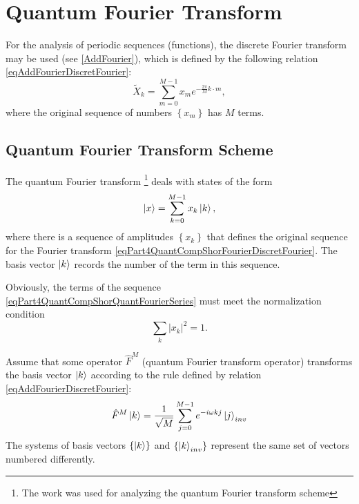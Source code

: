 \section{Quantum Fourier Transform}
For the analysis of periodic sequences (functions), the discrete Fourier transform may be used (see \autoref{AddFourier}), which is defined by the following relation \eqref{eqAddFourierDiscretFourier}:
\begin{equation}
\tilde{X}_k = \sum^{M - 1}_{m = 0} x_m e^{-\frac{2 \pi}{M} k\cdot m},
\label{eqPart4QuantCompShorFourierDiscretFourier}
\end{equation}
where the original sequence of numbers $\left\{x_m\right\}$ has $M$ terms.

\subsection{Quantum Fourier Transform Scheme}
The quantum Fourier transform \footnote{The work \cite{DBLP:conf/new2an/2015} was used for analyzing the quantum Fourier transform scheme} deals with states of the form 
\begin{equation}
\ket{x} = \sum_{k = 0}^{M - 1}x_k \ket{k},
\label{eqPart4QuantCompShorQuantFourierSeries}
\end{equation}
where there is a sequence of amplitudes $\left\{x_k\right\}$ that defines the original sequence for the Fourier transform \eqref{eqPart4QuantCompShorFourierDiscretFourier}. The basis vector $\ket{k}$ records the number of the term in this sequence.

Obviously, the terms of the sequence \eqref{eqPart4QuantCompShorQuantFourierSeries} must meet the normalization condition
\[
\sum_k\left|x_k\right|^2 = 1.
\]

Assume that some operator $\hat{F}^{M}$ (quantum Fourier transform operator) transforms the basis vector $\ket{k}$ according to the rule defined by relation \eqref{eqAddFourierDiscretFourier}:
\begin{equation}
\hat{F}^{M}\ket{k} = \frac{1}{\sqrt{M}}\sum_{j = 0}^{M -1} e^{-i \omega k j}\ket{j}_{inv} 
\label{eqPart4QuantCompShorQuantFourierBasis}
\end{equation}
The systems of basis vectors $\left\{\ket{k}\right\}$ and $\left\{\ket{k}_{inv}\right\}$ represent the same set of vectors numbered differently.


